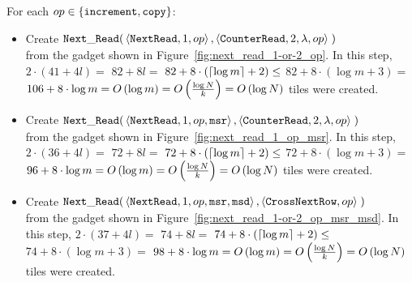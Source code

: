 For each $\inc\in \{ {\tt increment}, {\tt copy} \}$:
\begin{itemize}

    \item Create
    $\begin{aligned}[t]
        \nextread(& \left\langle {\tt NextRead},    1,          \inc \right\rangle,
                    \left\langle {\tt CounterRead}, 2, \lambda, \inc \right\rangle \;)
    \end{aligned}$\\from the gadget shown in Figure~\ref{fig:next_read_1-or-2_op}.
    In this step, $2 \cdot \left( 41 + 4l \right) =$
    $82 + 8l =$
    $82 + 8 \cdot \left( \ceil*{\log m} + 2 \right) \leq$
    $82 + 8 \cdot \left( {\log m} + 3 \right) =$
    $106 + 8 \cdot {\log m} = \bigologm$ tiles were created.
    \vspace{0.5cm}

    \item Create
    $\begin{aligned}[t]
        \nextread(& \left\langle {\tt NextRead},    1,          \inc, {\tt msr} \right\rangle,
                    \left\langle {\tt CounterRead}, 2, \lambda, \inc            \right\rangle \;)
    \end{aligned}$\\from the gadget shown in Figure~\ref{fig:next_read_1_op_msr}.
    In this step, $2 \cdot \left( 36 + 4l \right) =$
    $72 + 8l =$
    $72 + 8 \cdot \left( \ceil*{\log m} + 2 \right) \leq$
    $72 + 8 \cdot \left( {\log m} + 3 \right) =$
    $96 + 8 \cdot {\log m} = \bigologm$ tiles were created.
    \vspace{0.5cm}

    \item Create
    $\begin{aligned}[t]
        \nextread(& \left\langle {\tt NextRead}, 1,  \inc, {\tt msr}, {\tt msd} \right\rangle,
                    \left\langle {\tt CrossNextRow}, \inc                       \right\rangle \;)
    \end{aligned}$\\from the gadget shown in Figure~\ref{fig:next_read_1-or-2_op_msr_msd}.
    In this step, $2 \cdot \left( 37 + 4l \right) =$
    $74 + 8l =$
    $74 + 8 \cdot \left( \ceil*{\log m} + 2 \right) \leq$
    $74 + 8 \cdot \left( {\log m} + 3 \right) =$
    $98 + 8 \cdot {\log m} = \bigologm$ tiles were created.
    \vspace{0.5cm}


\end{itemize}
